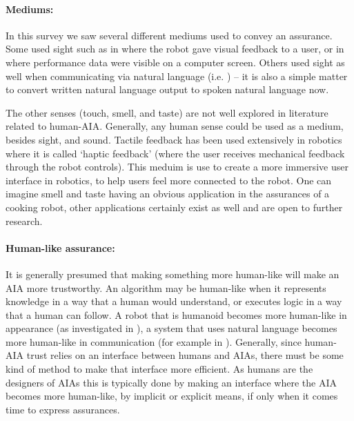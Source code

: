     \paragraph{Mediums:} In this survey we saw several different mediums used to convey an assurance. Some used sight such as in \cite{Chadalavada2015-wx} where the robot gave visual feedback to a user, or in \cite{Muir1996-gt} where performance data were visible on a computer screen. Others used sight as well when communicating via natural language (i.e. \cite{Wang2016-id}) -- it is also a simple matter to convert written natural language output to spoken natural language now.
    
    The other senses (touch, smell, and taste) are not well explored in literature related to human-AIA. Generally, any human sense could be used as a medium, besides sight, and sound. Tactile feedback has been used extensively in robotics where it is called `haptic feedback' (where the user receives mechanical feedback through the robot controls). This meduim is use to create a more immersive user interface in robotics, to help users feel more connected to the robot. One can imagine smell and taste having an obvious application in the assurances of a cooking robot, other applications certainly exist as well and are open to further research.

    \paragraph{Human-like assurance:} It is generally presumed that making something more human-like will make an AIA more trustworthy. An algorithm may be human-like when it represents knowledge in a way that a human would understand, or executes logic in a way that a human can follow. A robot that is humanoid becomes more human-like in appearance (as investigated in \cite{Bainbridge2011-pl}), a system that uses natural language becomes more human-like in communication (for example in \cite{Lacave2002-cu}). Generally, since human-AIA trust relies on an interface between humans and AIAs, there must be some kind of method to make that interface more efficient. As humans are the designers of AIAs this is typically done by making an interface where the AIA becomes more human-like, by implicit or explicit means, if only when it comes time to express assurances.

